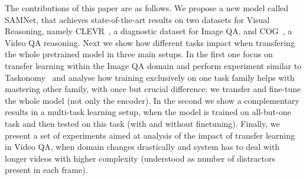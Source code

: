 The contributions of this paper are as follows.
We propose a new model called SAMNet, that achieves state-of-the-art results on two datasets for Visual Reasoning, namely CLEVR~\cite{johnson2017clevr}, a diagnostic dataset for Image QA, and COG~\cite{yang2018dataset}, a Video QA reasoning.
Next we show how different tasks impact when transfering the whole pretrained model in three main setups.
In the first one focus on transfer learning within the Image QA domain and perform experiment similar to Taskonomy~\cite{zamir2018taskonomy} and analyse how training exclusively on one task family helps with mastering other family, with once but crucial difference: we transfer and fine-tune the whole model (not only the encoder).
In the second we show a complementary results in a multi-task learning setup, when the model is trained on all-but-one task and then tested on this task (with and without finetuning).
Finally, we present a set of experiments aimed at analysis of the impact of transfer learning in Video QA, when domain changes drastically and system has to deal with longer videos with higher complexity (understood as number of distractors present in each frame).


 








